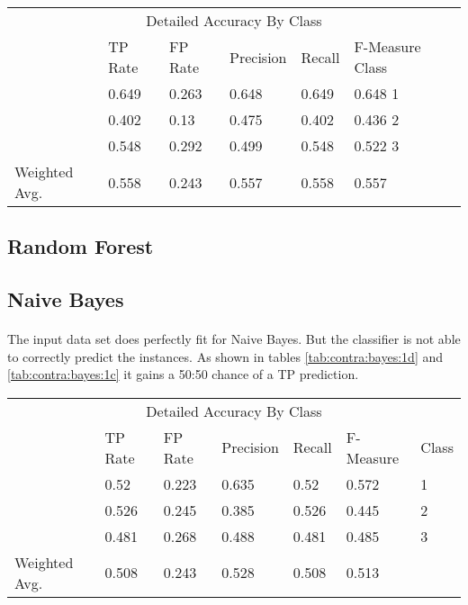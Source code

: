 \documentclass[paper=a4, fontsize=11pt]{scrartcl} %
\numberwithin{equation}{section} %
\numberwithin{figure}{section} %
\numberwithin{table}{section} %
\begin{document}
 
\begin{table*}[htb]\centering
  \begin{tabular*}{\columnwidth}{@{}lllllll@{}}
      \toprule 
      \multicolumn{7}{c}{Detailed Accuracy By Class} \\ 
               &  TP Rate & FP Rate & Precision & Recall & F-Measure  Class \\ \midrule   
               &  0.649   & 0.263   & 0.648     & 0.649  & 0.648      1     \\    
               &  0.402   & 0.13    & 0.475     & 0.402  & 0.436      2     \\        
               &  0.548   & 0.292   & 0.499     & 0.548  & 0.522      3     \\    
Weighted Avg.  &  0.558   & 0.243   & 0.557     & 0.558  & 0.557            \\ \bottomrule 
    \end{tabular*}
\caption{Decision Tree on Contraceptive Data Set -- using binary splits} 
\label{tab:contra:dec:bin}
\end{table*}
\FloatBarrier

\subsection{Random Forest}


\subsection{Naive Bayes}

\paragraph{}The input data set does perfectly fit for Naive Bayes. But the classifier is not able to correctly predict the instances. As shown in tables \ref{tab:contra:bayes:1d} and \ref{tab:contra:bayes:1c} it gains a 50:50 chance of a TP prediction.


\begin{table*}[htb]\centering
  \begin{tabular*}{\columnwidth}{@{}lllllll@{}}
      \toprule 
      \multicolumn{7}{c}{Detailed Accuracy By Class} \\ 
               &  TP Rate & FP Rate & Precision & Recall & F-Measure & Class \\   \midrule
               &  0.52    & 0.223   & 0.635     & 0.52   & 0.572     & 1  \\   \midrule
               &  0.526   & 0.245   & 0.385     & 0.526  & 0.445     & 2  \\
               &  0.481   & 0.268   & 0.488     & 0.481  & 0.485     & 3  \\
Weighted Avg.  &  0.508   & 0.243   & 0.528     & 0.508  & 0.513     &    \\   \bottomrule
    \end{tabular*}
\caption{Naive Bayes} 
\label{tab:contra:bayes:1d}
\end{table*}
\end{document}
